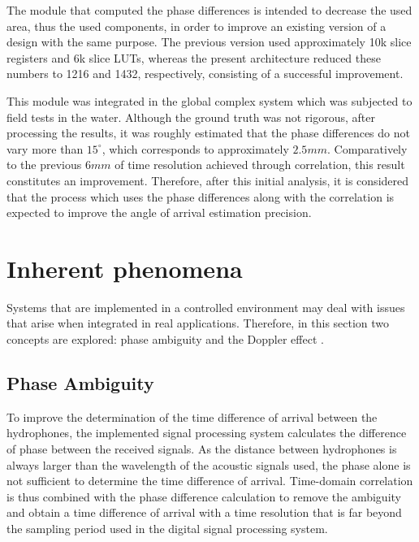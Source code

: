 The module that computed the phase differences is intended to decrease the used area, thus the used components, in order to improve an existing version of a design with the same purpose. The previous version used approximately 10k slice registers and 6k slice LUTs, whereas the present architecture reduced these numbers to 1216 and 1432, respectively, consisting of a successful improvement.

This module was integrated in the global complex system which was subjected to field tests in the water. Although the ground truth was not rigorous, after processing the results, it was roughly estimated that the phase differences do not vary more than $15^{\circ}$, which corresponds to approximately $2.5mm$. Comparatively to the previous $6mm$ of time resolution achieved through correlation, this result constitutes an improvement. Therefore, after this initial analysis, it is considered that the process which uses the phase differences along with the correlation is expected to improve the angle of arrival estimation precision.

\section{Inherent phenomena}

Systems that are implemented in a controlled environment may deal with issues that arise when integrated in real applications. Therefore, in this section two concepts are explored: phase ambiguity and the Doppler effect .

\subsection{Phase Ambiguity}

To improve the determination of the time difference of arrival between the hydrophones, the implemented signal processing system calculates the difference of phase between the received signals. As the distance between hydrophones is always larger than the wavelength of the acoustic signals used, the phase alone is not sufficient to determine the time difference of arrival. Time-domain correlation is thus combined with the phase difference calculation to remove the ambiguity and obtain a time difference of arrival with a time resolution that is far beyond the sampling period used in the digital signal processing system.

